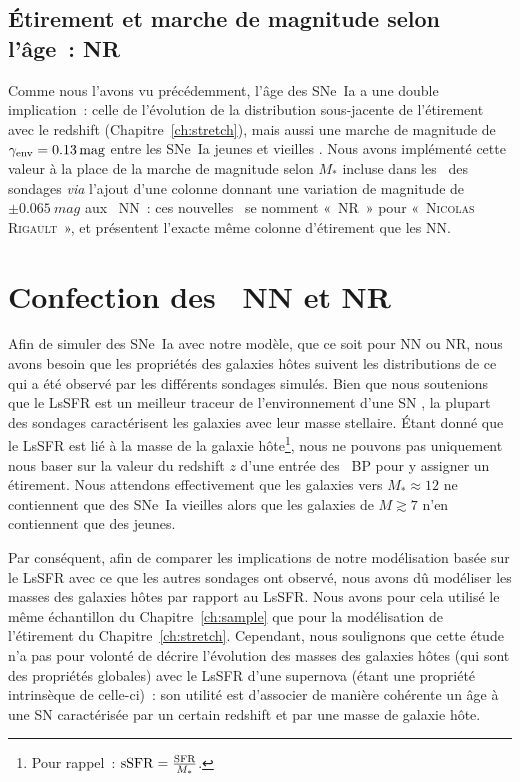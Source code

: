 \documentclass[../main/main.tex]{subfiles}
\begin{document}
\subsection{Étirement et marche de magnitude selon l'âge~: NR}\label{ssec:nr}

Comme nous l'avons vu précédemment, l'âge des SNe~Ia a une double implication~:
celle de l'évolution de la distribution sous-jacente de l'étirement avec le
redshift (Chapitre~\ref{ch:stretch}), mais aussi une marche de magnitude de
$\gamma_{\rm env} = \SI{0,13}{mag}$ entre les SNe~Ia jeunes et vieilles
\citep[Chapitre~\ref{ch:stretch},][]{rigault2020}. Nous avons implémenté cette
valeur à la place de la marche de magnitude selon $M_*$ incluse dans les
\wgtmap\ des sondages \textit{via} l'ajout d'une colonne donnant une variation
de magnitude de $\pm\SI{0.065}{mag}$ aux \hostlib\ NN~: ces nouvelles \hostlib\
se nomment «~NR~» pour «~\textsc{Nicolas} \textsc{Rigault}~», et présentent
l'exacte même colonne d'étirement que les NN.

\section{Confection des \hostlib\ NN et NR}\label{sec:hmake}

Afin de simuler des SNe~Ia avec notre modèle, que ce soit pour NN ou NR, nous
avons besoin que les propriétés des galaxies hôtes suivent les distributions de
ce qui a été observé par les différents sondages simulés. Bien que nous
soutenions que le LsSFR est un meilleur traceur de l'environnement d'une SN
\citep{briday2022}, la plupart des sondages caractérisent les galaxies avec leur
masse stellaire. Étant donné que le LsSFR est lié à la masse de la galaxie
hôte\footnote{Pour rappel~: $\mathrm{sSFR} = \frac{\rm SFR}{M_*}$.}, nous ne
pouvons pas uniquement nous baser sur la valeur du redshift $z$ d'une entrée des
\hostlib\ BP pour y assigner un étirement. Nous attendons effectivement que les
galaxies vers $M_*\approx12$ ne contiennent que des SNe~Ia vieilles alors que
les galaxies de $M \gtrsim 7$ n'en contiennent que des jeunes.

Par conséquent, afin de comparer les implications de notre modélisation basée
sur le LsSFR avec ce que les autres sondages ont observé, nous avons dû
modéliser les masses des galaxies hôtes par rapport au LsSFR. Nous avons pour
cela utilisé le même échantillon du Chapitre~\ref{ch:sample} que pour la
modélisation de l'étirement du Chapitre~\ref{ch:stretch}. Cependant, nous
soulignons que cette étude n'a pas pour volonté de décrire l'évolution des
masses des galaxies hôtes (qui sont des propriétés globales) avec le LsSFR d'une
supernova (étant une propriété intrinsèque de celle-ci)~: son utilité est
d'associer de manière cohérente un âge à une SN caractérisée par un certain
redshift et par une masse de galaxie hôte.
\end{document}
